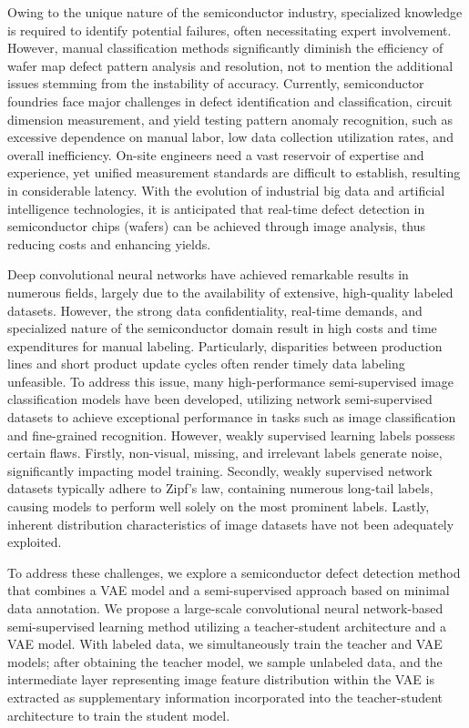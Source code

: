 \documentclass[conference]{IEEEtran}
\begin{document}
Owing to the unique nature of the semiconductor industry, specialized knowledge is required to identify potential failures, often necessitating expert involvement. However, manual classification methods significantly diminish the efficiency of wafer map defect pattern analysis and resolution, not to mention the additional issues stemming from the instability of accuracy. Currently, semiconductor foundries face major challenges in defect identification and classification, circuit dimension measurement, and yield testing pattern anomaly recognition, such as excessive dependence on manual labor, low data collection utilization rates, and overall inefficiency. On-site engineers need a vast reservoir of expertise and experience, yet unified measurement standards are difficult to establish, resulting in considerable latency. With the evolution of industrial big data and artificial intelligence technologies, it is anticipated that real-time defect detection in semiconductor chips (wafers) can be achieved through image analysis, thus reducing costs and enhancing yields\cite{Xiaolei2016Wafer,2022Semi}.

Deep convolutional neural networks have achieved remarkable results in numerous fields, largely due to the availability of extensive, high-quality labeled datasets. However, the strong data confidentiality, real-time demands, and specialized nature of the semiconductor domain result in high costs and time expenditures for manual labeling\cite{2022SYSTEMS}. Particularly, disparities between production lines and short product update cycles often render timely data labeling unfeasible\cite{nakazawa2018wafer}. To address this issue, many high-performance semi-supervised image classification models have been developed, utilizing network semi-supervised datasets to achieve exceptional performance in tasks such as image classification and fine-grained recognition\cite{li2020dividemix,kong2019recycling}. However, weakly supervised learning labels possess certain flaws. Firstly, non-visual, missing, and irrelevant labels generate noise, significantly impacting model training. Secondly, weakly supervised\cite{zhou2018brief} network datasets typically adhere to Zipf's law, containing numerous long-tail labels, causing models to perform well solely on the most prominent labels. Lastly, inherent distribution characteristics of image datasets have not been adequately exploited.

To address these challenges, we explore a semiconductor defect detection method that combines a VAE model and a semi-supervised approach based on minimal data annotation. We propose a large-scale convolutional neural network-based semi-supervised learning method utilizing a teacher-student architecture and a VAE model. With labeled data, we simultaneously train the teacher and VAE models; after obtaining the teacher model, we sample unlabeled data, and the intermediate layer representing image feature distribution within the VAE is extracted as supplementary information incorporated into the teacher-student architecture to train the student model.
\end{document}
